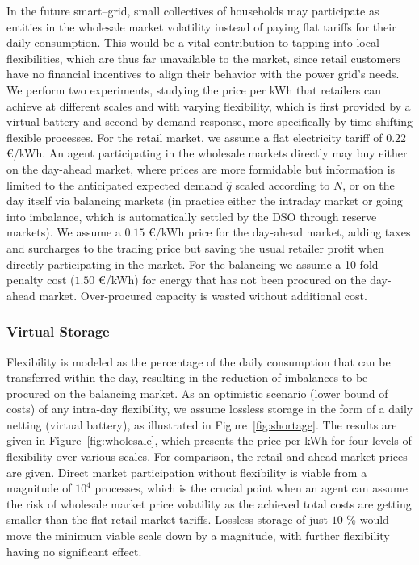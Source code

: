 \documentclass[conference]{IEEEtran}
\begin{document}
In the future smart--grid, small collectives of households may participate as entities in the wholesale market volatility instead of paying flat tariffs for their daily consumption. This would be a vital contribution to tapping into local flexibilities, which are thus far unavailable to the market, since retail customers have no financial incentives to align their behavior with the power grid's needs.
We perform two experiments, studying the price per kWh that retailers can achieve at different scales and with varying flexibility, which is first provided by a virtual battery and second by demand response, more specifically by time-shifting flexible processes. For the retail market, we assume a flat electricity tariff of $0.22$ \euro/kWh. An agent participating in the wholesale markets directly may buy either on the day-ahead market, where prices are more formidable but information is limited to the anticipated expected demand $\hat q$ scaled according to $N$, or on the day itself via balancing markets (in practice either the intraday market or going into imbalance, which is automatically settled by the DSO through reserve markets). We assume a $0.15$ \euro/kWh price for the day-ahead market, adding taxes and surcharges to the trading price but saving the usual retailer profit when directly participating in the market. For the balancing we assume a 10-fold penalty cost ($1.50$ \euro/kWh) for energy that has not been procured on the day-ahead market. Over-procured capacity is wasted without additional cost.

\subsubsection{Virtual Storage}
Flexibility is modeled as the percentage of the daily consumption that can be transferred within the day, resulting in the reduction of imbalances to be procured on the balancing market. As an optimistic scenario (lower bound of costs) of any intra-day flexibility, we assume lossless storage in the form of a daily netting (virtual battery), as illustrated in Figure~\ref{fig:shortage}.
The results are given in Figure~\ref{fig:wholesale}, which presents the price per kWh for four levels of flexibility over various scales. For comparison, the retail and ahead market prices are given. Direct market participation without flexibility is viable from a magnitude of $10^4$ processes, which is the crucial point when an agent can assume the risk of wholesale market price volatility as the achieved total costs are getting smaller than the flat retail market tariffs. Lossless storage of just $10$ \% would move the minimum viable scale down by a magnitude, with further flexibility having no significant effect.
\end{document}
